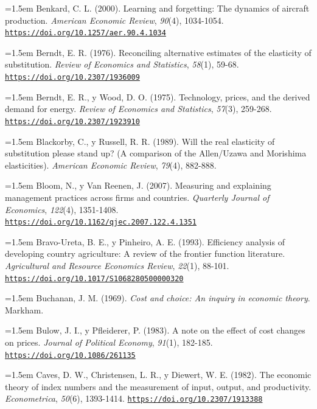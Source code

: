 \documentclass[10pt,a4paper]{article}
\begin{document}
\noindent\hangindent=1.5em Benkard, C. L. (2000). Learning and forgetting: The dynamics of aircraft production. \textit{American Economic Review}, \textit{90}(4), 1034-1054. \href{https://doi.org/10.1257/aer.90.4.1034}{\nolinkurl{https://doi.org/10.1257/aer.90.4.1034}}

\noindent\hangindent=1.5em Berndt, E. R. (1976). Reconciling alternative estimates of the elasticity of substitution. \textit{Review of Economics and Statistics}, \textit{58}(1), 59-68. \href{https://doi.org/10.2307/1936009}{\nolinkurl{https://doi.org/10.2307/1936009}}

\noindent\hangindent=1.5em Berndt, E. R., y Wood, D. O. (1975). Technology, prices, and the derived demand for energy. \textit{Review of Economics and Statistics}, \textit{57}(3), 259-268. \href{https://doi.org/10.2307/1923910}{\nolinkurl{https://doi.org/10.2307/1923910}}

\noindent\hangindent=1.5em Blackorby, C., y Russell, R. R. (1989). Will the real elasticity of substitution please stand up? (A comparison of the Allen/\allowbreak Uzawa and Morishima elasticities). \textit{American Economic Review}, \textit{79}(4), 882-888.

\noindent\hangindent=1.5em Bloom, N., y Van Reenen, J. (2007). Measuring and explaining management practices across firms and countries. \textit{Quarterly Journal of Economics}, \textit{122}(4), 1351-1408. \href{https://doi.org/10.1162/qjec.2007.122.4.1351}{\nolinkurl{https://doi.org/10.1162/qjec.2007.122.4.1351}}

\noindent\hangindent=1.5em Bravo-Ureta, B. E., y Pinheiro, A. E. (1993). Efficiency analysis of developing country agriculture: A review of the frontier function literature. \textit{Agricultural and Resource Economics Review}, \textit{22}(1), 88-101. \href{https://doi.org/10.1017/S1068280500000320}{\nolinkurl{https://doi.org/10.1017/S1068280500000320}}

\noindent\hangindent=1.5em Buchanan, J. M. (1969). \textit{Cost and choice: An inquiry in economic theory}. Markham.

\noindent\hangindent=1.5em Bulow, J. I., y Pfleiderer, P. (1983). A note on the effect of cost changes on prices. \textit{Journal of Political Economy}, \textit{91}(1), 182-185. \href{https://doi.org/10.1086/261135}{\nolinkurl{https://doi.org/10.1086/261135}}

\noindent\hangindent=1.5em Caves, D. W., Christensen, L. R., y Diewert, W. E. (1982). The economic theory of index numbers and the measurement of input, output, and productivity. \textit{Econometrica}, \textit{50}(6), 1393-1414. \href{https://doi.org/10.2307/1913388}{\nolinkurl{https://doi.org/10.2307/1913388}}
\end{document}

